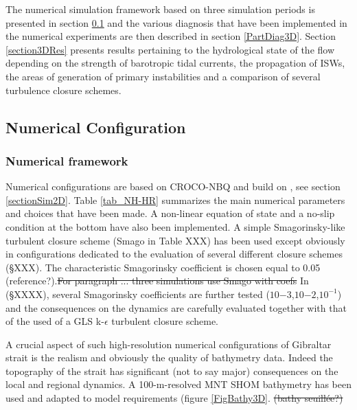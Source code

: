 The numerical simulation framework \color{blue} based on three simulation periods is presented in section \ref{section3Dnum} and the various diagnosis that have been implemented in the numerical experiments are then described in section \ref{PartDiag3D}. Section \ref{section3DRes} presents results pertaining to the hydrological state of the flow depending on the strength of barotropic tidal currents, the propagation of ISWs, the areas of generation of primary instabilities and a comparison of several turbulence closure schemes.\color{black}

\subsection{Numerical Configuration}
\label{section3Dnum}

\subsubsection{Numerical framework}

\color{blue}Numerical configurations are based on \color{black} CROCO-NBQ and build on \citet{hilt_2020}, see section \ref{sectionSim2D}. \color{black} Table \ref{tab_NH-HR} summarizes \color{blue} the main numerical parameters and choices that have been made. A non-linear equation of state and a no-slip condition at the bottom have also been implemented. \color{blue} A simple Smagorinsky-like turbulent closure scheme (Smago in Table XXX) has been used except obviously in configurations dedicated to the evaluation of several different closure schemes (\S XXX). The characteristic Smagorinsky coefficient is chosen equal to 0.05 (reference?).\sout{For paragraph ... three simulations use Smago with coefs} In (\S XXXX), several Smagorinsky coefficients are further tested  ($10{-3}$,$10{-2}$,$10^{-1}$) and the consequences on the dynamics are carefully evaluated together with that of the used of a GLS k-$\epsilon$ turbulent closure scheme. \color{black}

\color{blue}A crucial aspect of such high-resolution numerical configurations of Gibraltar strait is the realism and obviously the quality of bathymetry data. Indeed the topography of the strait has significant (not to say major) consequences on the local and regional dynamics. A 100-m-resolved MNT SHOM bathymetry has been used and adapted to model requirements (figure \ref{FigBathy3D}. \sout{(bathy seuillée?)} \color{black}

